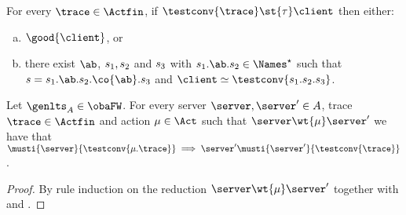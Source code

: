 \begin{lemma}
  \label{lem:inversion-feeder-tau}
  For every $\trace \in \Actfin$,
  if $\testconv{\trace} \st{\tau} \client$
    then either:
  \begin{enumerate}[(a)]
  \item\label{inversion-feeder-tau-ok} $\good{ \client }$, or
  \item\label{inversion-feeder-tau-split}
    there exist $\ab$, $\traceA, \traceB$ and $\traceC$ with
    $\traceA.\ab.\traceB \in \Names^\star$ such that
    $s = \traceA.\ab.\traceB.\co{\ab}.\traceC$ and
    $\client \simeq \testconv{\traceA.\traceB.\traceC}$.
    \end{enumerate}
\end{lemma}


\renewcommand{\stateB}{q}
\renewcommand{\traceB}{\traceC}


\renewcommand{\traceA}{s_1}
\renewcommand{\traceB}{s_2}
\renewcommand{\traceC}{s_3}



\begin{lemma}
  \label{lem:must-gen-conv-wt-mu}
  Let $\genlts_A \in \obaFW$. For every server $\server, \server' \in \States$,
  trace $\trace \in \Actfin$ and
  action $\mu \in \Act$ such that $\server \wt{\mu} \server'$
  we have that
  $\musti{\server}{\testconv{\mu.\trace}} \implies \server' \musti{\server'}{\testconv{\trace}}$.
\end{lemma}
\begin{proof}
  By rule induction on the reduction $\server \wt{\mu} \server'$ together with
   and .
\end{proof}

